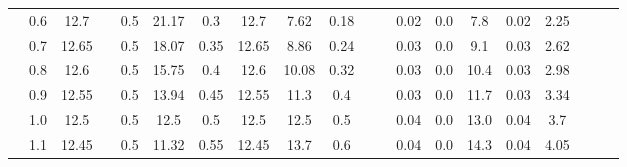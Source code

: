 \documentclass[a4paper,12pt]{article}
\begin{document}
\begin{table}[htbp]
\begin{tabular}{|c|c|c|c|c|c|c|c|c|c|c|c|c|c|c|c|c|c|c|c|}
			& 0.6        & 12.7       &                       & 0.5           & 21.17         & 0.3           & 12.7          & 7.62          & 0.18          &                        &                         & 0.02               & 0.0                & 7.8        & 0.02            & 2.25                &                       &                       &                       \\ \cline{2-3} \cline{5-10} \cline{13-17}
			& 0.7        & 12.65      &                       & 0.5           & 18.07         & 0.35          & 12.65         & 8.86          & 0.24          &                        &                         & 0.03               & 0.0                & 9.1        & 0.03            & 2.62                &                       &                       &                       \\ \cline{2-3} \cline{5-10} \cline{13-17}
			& 0.8        & 12.6       &                       & 0.5           & 15.75         & 0.4           & 12.6          & 10.08         & 0.32          &                        &                         & 0.03               & 0.0                & 10.4       & 0.03            & 2.98                &                       &                       &                       \\ \cline{2-3} \cline{5-10} \cline{13-17}
			& 0.9        & 12.55      &                       & 0.5           & 13.94         & 0.45          & 12.55         & 11.3          & 0.4           &                        &                         & 0.03               & 0.0                & 11.7       & 0.03            & 3.34                &                       &                       &                       \\ \cline{2-3} \cline{5-10} \cline{13-17}
			& 1.0        & 12.5       &                       & 0.5           & 12.5          & 0.5           & 12.5          & 12.5          & 0.5           &                        &                         & 0.04               & 0.0                & 13.0       & 0.04            & 3.7                 &                       &                       &                       \\ \cline{2-3} \cline{5-10} \cline{13-17}
			& 1.1        & 12.45      &                       & 0.5           & 11.32         & 0.55          & 12.45         & 13.7          & 0.6           &                        &                         & 0.04               & 0.0                & 14.3       & 0.04            & 4.05                &                       &                       &                       \\ \cline{2-3} \cline{5-10} \cline{13-17}

\end{tabular}
\end{table}
\end{document}

